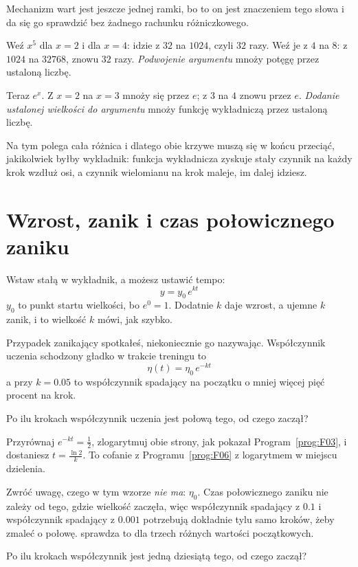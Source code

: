 \begin{fr}
Mechanizm wart jest jeszcze jednej ramki, bo to on jest znaczeniem tego słowa i
da się go sprawdzić bez żadnego rachunku różniczkowego.

Weź $x^{5}$ dla $x = 2$ i dla $x = 4$: idzie z $32$ na $1024$, czyli $32$ razy.
Weź je z $4$ na $8$: z $1024$ na $32768$, znowu $32$ razy. \emph{Podwojenie
argumentu} mnoży potęgę przez ustaloną liczbę.

Teraz $e^{x}$. Z $x = 2$ na $x = 3$ mnoży się przez $e$; z $3$ na $4$ znowu
przez $e$. \emph{Dodanie ustalonej wielkości do argumentu} mnoży funkcję
wykładniczą przez ustaloną liczbę.

Na tym polega cała różnica i dlatego obie krzywe muszą się w końcu przeciąć,
jakikolwiek byłby wykładnik: funkcja wykładnicza zyskuje stały czynnik na
każdy krok wzdłuż osi, a czynnik wielomianu na krok maleje, im dalej idziesz.
\end{fr}


\section{Wzrost, zanik i czas połowicznego zaniku}
\label{sec:F07-decay}

\begin{fr}
Wstaw stałą w wykładnik, a możesz ustawić tempo:
\[ y = y_0\,e^{kt} \]
$y_0$ to punkt startu wielkości, bo $e^{0} = 1$. Dodatnie $k$ daje wzrost, a
ujemne $k$ zanik, i to wielkość $k$ mówi, jak szybko.

Przypadek zanikający spotkałeś, niekoniecznie go nazywając. Współczynnik
uczenia schodzony gładko w trakcie treningu to
\[ \eta(t) = \eta_0\,e^{-kt} \]
a przy $k = \num{0.05}$ to współczynnik spadający na początku o mniej więcej
pięć procent na krok.

Po ilu krokach współczynnik uczenia jest połową tego, od czego zaczął?
\nextframe
\end{fr}

\begin{fr}
Przyrównaj $e^{-kt} = \frac{1}{2}$, zlogarytmuj obie strony, jak pokazał
Program~\ref{prog:F03}, i dostaniesz $t = \frac{\ln 2}{k}$. To cofanie z
Programu~\ref{prog:F06} z logarytmem w miejscu dzielenia.

Zwróć uwagę, czego w tym wzorze \emph{nie ma}: $\eta_0$. Czas połowicznego
zaniku nie zależy od tego, gdzie wielkość zaczęła, więc współczynnik spadający
z $\num{0.1}$ i współczynnik spadający z $\num{0.001}$ potrzebują dokładnie
tylu samo kroków, żeby zmaleć o połowę. 
sprawdza to dla trzech różnych wartości początkowych.

Po ilu krokach współczynnik jest jedną dziesiątą tego, od czego zaczął?
\nextframe
\end{fr}

